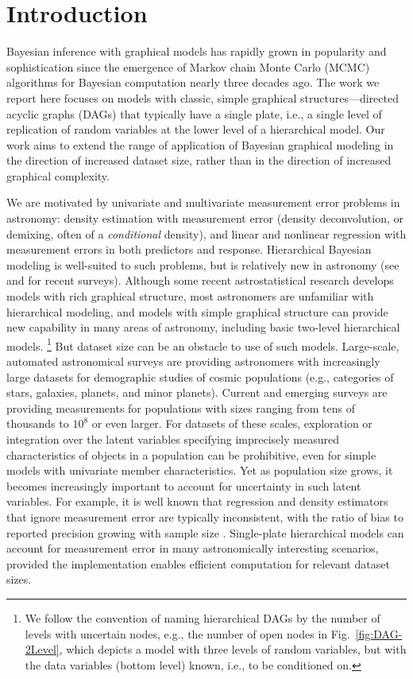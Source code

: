 \section{Introduction}
\label{sec:intro}

Bayesian inference with graphical models has rapidly grown in popularity and sophistication since the emergence of Markov chain Monte Carlo (MCMC) algorithms for Bayesian computation nearly three decades ago.
The work we report here focuses on models with classic, simple graphical structures---directed acyclic graphs (DAGs) that typically have a single plate, i.e., a single level of replication of random variables at the lower level of a hierarchical model.
Our work aims to extend the range of application of Bayesian graphical modeling in the direction of increased dataset size, rather than in the direction of increased graphical complexity.

We are motivated by univariate and multivariate measurement error problems in astronomy: density estimation with measurement error (density deconvolution, or demixing, often of a \emph{conditional} density), and linear and nonlinear regression with measurement errors in both predictors and response.
Hierarchical Bayesian modeling is well-suited to such problems, but is relatively new in astronomy (see \citealt{kelly-measurement2012} and \citealt{loredo2013survey} for recent surveys).
Although some recent astrostatistical research develops models with rich graphical structure, most astronomers are unfamiliar with hierarchical modeling, and models with simple graphical structure can provide new capability in many areas of astronomy, including basic two-level hierarchical models.%
\footnote{We follow the convention of naming hierarchical DAGs by the number of levels with uncertain nodes, e.g., the number of open nodes in Fig.~\ref{fig:DAG-2Level}, which depicts a model with three levels of random variables, but with the data variables (bottom level) known, i.e., to be conditioned on.}
But dataset size can be an obstacle to use of such models.
Large-scale, automated astronomical surveys are providing astronomers with increasingly large datasets for demographic studies of cosmic populations (e.g., categories of stars, galaxies, planets, and minor planets).
Current and emerging surveys are providing measurements for populations with sizes ranging from tens of thousands to $10^8$ or even larger.
For datasets of these scales, exploration or integration over the latent variables specifying imprecisely measured characteristics of objects in a population can be prohibitive, even for simple models with univariate member characteristics.
Yet as population size grows, it becomes increasingly important to account for uncertainty in such latent variables.
For example, it is well known that regression and density estimators that ignore measurement error are typically inconsistent, with the ratio of bias to reported precision growing with sample size \citep{C+06-MsmtErr}.
Single-plate hierarchical models can account for measurement error in many astronomically interesting scenarios, provided the implementation enables efficient computation for relevant dataset sizes.

